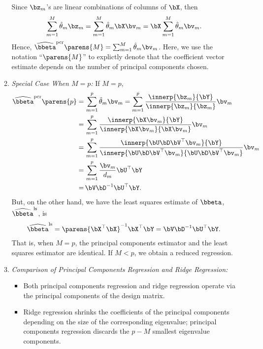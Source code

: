 \documentclass[12pt]{article}
\begin{document}
\begin{enumerate}[label=\textbf{\arabic*.}]
\begin{enumerate}
		Since $\bz_m$'s are linear combinations of columns of $\bX$, then 
		\begin{align*}
			\sum_{m=1}^M \hat{\theta}_m \bz_m = \sum_{m=1}^M \hat{\theta}_m \bX \bv_m = \bX \sum_{m=1}^M \hat{\theta}_m \bv_m. 
		\end{align*}
		Hence, $\widehat{\bbeta}^{\mathrm{pcr}} \parens{M} = \sum_{m=1}^M \hat{\theta}_m \bv_m$. Here, we use the notation ``$\parens{M}$'' to explictly denote that the coefficient vector estimate depends on the number of principal components chosen. 
		
		\item \textit{Special Case When $M = p$:} If $M = p$, 
		\begin{align*}
			\widehat{\bbeta}^{\mathrm{pcr}} \parens{p} = & \, \sum_{m=1}^p \hat{\theta}_m \bv_m = \sum_{m=1}^p \frac{\innerp{\bz_m}{\bY}}{\innerp{\bz_m}{\bz_m}} \bv_m \\ 
			= & \, \sum_{m=1}^p \frac{\innerp{\bX \bv_m}{\bY}}{\innerp{\bX \bv_m}{\bX \bv_m}} \bv_m \\ 
			= & \, \sum_{m=1}^p \frac{\innerp{\bU \bD \bV^\top \bv_m}{\bY}}{\innerp{\bU \bD \bV^\top \bv_m}{\bU \bD \bV^\top \bv_m}} \bv_m  \\ 
			= & \, \sum_{m=1}^p \frac{\bv_m}{d_m} \bU^\top \bY \\ 
			= & \, \bV \bD^{-1} \bU^\top \bY. 
		\end{align*}
		But, on the other hand, we have the least squares estimate of $\bbeta$, $\widehat{\bbeta}^{\mathrm{ls}}$, is 
		\begin{align*}
			\widehat{\bbeta}^{\mathrm{ls}} = \parens{\bX^\top \bX}^{-1} \bX^\top \bY = \bV \bD^{-1} \bU^\top \bY. 
		\end{align*}
		That is, when $M = p$, the principal components estimator and the least squares estimator are identical. If $M < p$, we obtain a reduced regression. 
		
		\item \textit{Comparison of Principal Components Regression and Ridge Regression:} 
		\begin{itemize}
			\item Both principal components regression and ridge regression operate via the principal components of the design matrix. 
			\item Ridge regression shrinks the coefficients of the principal components  depending on the size of the corresponding eigenvalue; principal components regression discards the $p - M$ smallest eigenvalue components. 
		\end{itemize}
	\end{enumerate}


\end{enumerate}
\end{document}
